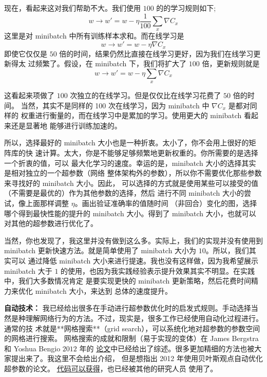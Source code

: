 现在，看起来这对我们帮助不大。我们使用 $100$ 的\minibatch{}的学习规则如下;
\begin{equation}
  w \rightarrow w' = w-\eta \frac{1}{100} \sum_x \nabla C_x
  \label{eq:100}\tag{100}
\end{equation}
这里是对 minibatch 中所有训练样本求和。而在线学习是
\begin{equation}
  w \rightarrow w' = w-\eta \nabla C_x
  \label{eq:101}\tag{101}
\end{equation}
即使它仅仅是 $50$ 倍的时间，结果仍然比直接在线学习更好，因为我们在线学习更新得太
过频繁了。假设，在 minibatch 下，我们将\learningrate{}扩大了 $100$ 倍，更新规则就是
\begin{equation}
  w \rightarrow w' = w-\eta \sum_x \nabla C_x
  \label{eq:102}\tag{102}
\end{equation}

这看起来项做了 $100$ 次独立的在线学习。但是仅仅比在线学习花费了 $50$ 倍的时间。
当然，其实不是同样的 100 次在线学习，因为 minibatch 中 $\nabla C_x$ 是都对同样的
权重进行衡量的，而在线学习中是累加的学习。使用更大的 minibatch 看起来还是显著地
能够进行训练加速的。

所以，选择最好的 minibatch 大小也是一种折衷。太小了，你不会用上很好的矩阵库的快
速计算。太大，你是不能够足够频繁地更新权重的。你所需要的是选择一个折衷的值，可以
最大化学习的速度。幸运的是，minibatch 大小的选择其实是相对独立的一个超参数（网络
  整体架构外的参数），所以你不需要优化那些参数来寻找好的 minibatch 大小。因此，
可以选择的方式就是使用某些可以接受的值（不需要是最优的）作为其他参数的选择，然后
进行不同 minibatch 大小的尝试，像上面那样调整 $\eta$。画出验证准确率的值随时间
（非回合）变化的图，选择哪个得到最快性能的提升的 minibatch 大小。得到了
minibatch 大小，也就可以对其他的超参数进行优化了。

当然，你也发现了，我这里并没有做到这么多。实际上，我们的实现并没有使用到
minibatch 更新快速方法。就是简单使用了 minibatch 大小为 $10$。所以，我们其实可以
通过降低 minibatch 大小来进行提速。我也没有这样做，因为我希望展示 minibatch 大于
$1$ 的使用，也因为我实践经验表示提升效果其实不明显。在实践中，我们大多数情况肯定
是要实现更快的 minibatch 更新策略，然后花费时间精力来优化 minibatch 大小，来达到
总体的速度提升。

\textbf{自动技术：} 我已经给出很多在手动进行超参数优化时的启发式规则。手动选择当
然是种理解网络行为的方法。不过，现实是，很多工作已经使用自动化过程进行。通常的技
术就是**网格搜索**（grid search），可以系统化地对超参数的参数空间的网格进行搜索。
网格搜索的成就和限制（易于实现的变体）在 James Bergstra 和 Yoshua Bengio $2012$
年的
\href{http://papers.nips.cc/paper/4522-practical-bayesian-optimization-of-machine-learning-algorithms.pdf}{
  论文}中已经给出了综述。很多更加精细的方法也被大家提出来了。我这里不会给出介绍，
但是想指出 2012 年使用贝叶斯观点自动优化超参数的论文。
\href{https://github.com/jaberg/hyperopt}{代码可以获得}，也已经被其他的研究人员
使用了。

